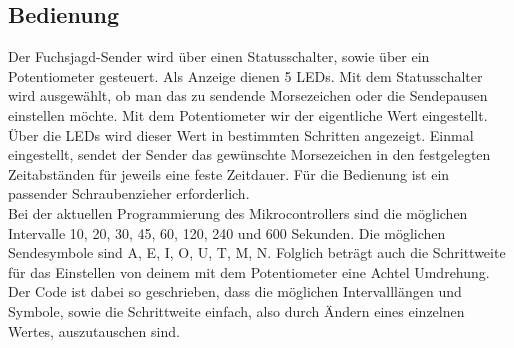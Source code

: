 \subsection{Bedienung}
Der Fuchsjagd-Sender wird über einen Statusschalter, sowie über ein Potentiometer
gesteuert. Als Anzeige dienen 5 LEDs. Mit dem Statusschalter wird ausgewählt, ob
man das zu sendende Morsezeichen oder die Sendepausen einstellen möchte.
Mit dem Potentiometer wir der eigentliche Wert eingestellt. Über die LEDs wird dieser
Wert in bestimmten Schritten angezeigt. Einmal eingestellt, sendet der Sender das gewünschte
Morsezeichen in den festgelegten Zeitabständen für jeweils eine feste Zeitdauer. Für die Bedienung ist ein passender Schraubenzieher erforderlich.\\
Bei der aktuellen Programmierung des Mikrocontrollers sind die möglichen Intervalle 10, 20, 30, 45, 60, 120, 240 und 600 Sekunden.
Die möglichen Sendesymbole sind A, E, I, O, U, T, M, N. Folglich beträgt auch die Schrittweite für das Einstellen von deinem mit dem Potentiometer eine Achtel Umdrehung. \\
Der Code ist dabei so geschrieben, dass die möglichen Intervalllängen und Symbole, sowie die Schrittweite einfach, also durch Ändern eines einzelnen Wertes, auszutauschen sind.